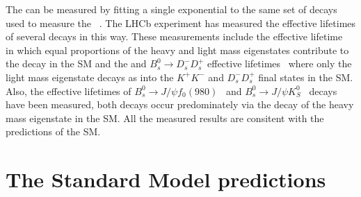 The \bsmumu \el can be measured by fitting a single exponential to the same set of decays used to measure the \BF~\cite{DeBruyn:2012wj}. The LHCb experiment has measured the effective lifetimes of several \bs decays in this way. These measurements include the \bskpi effective lifetime~\cite{Aaij:2014fia} in which equal proportions of the heavy and light \bs mass eigenstates contribute to the decay in the SM and the \bskk and $B^{0}_{s} \to D^{-}_{s} D^{+}_{s}$ effective lifetimes~\cite{Aaij:2014fia,Aaij:1463886, Aaij:2013bvd} where only the light \bs mass eigenstate decays as into the $K^{+}K^{-}$ and $D^{-}_{s} D^{+}_{s}$ final states in the SM. 
Also, the effective lifetimes of $B^{0}_{s} \to J/\psi f_{0}(980)$~\cite{Aaij:2012nta} and $B^{0}_{s} \to J/\psi K^{0}_{S}$~\cite{Aaij:2013eia} decays have been measured, both decays occur predominately via the decay of the heavy \bs mass eigenstate in the SM. All the measured results are consitent with the predictions of the SM. %






\section{The Standard Model predictions}
\label{sec:SM_predictions}

